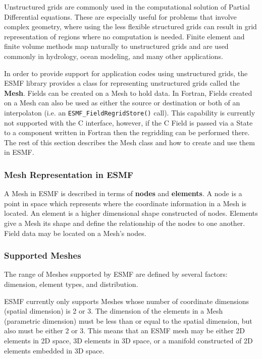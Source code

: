 
Unstructured grids are commonly used in the computational solution of Partial Differential equations.  These are especially useful for problems that involve complex geometry, where using the less flexible structured grids can
result in grid representation of regions where no computation is needed.  Finite
element and finite volume methods map naturally to unstructured grids and are used commonly
in hydrology, ocean modeling, and many other applications.

In order to provide support for application codes using unstructured grids, the ESMF library provides a class for representing 
unstructured grids called the {\bf Mesh}. Fields can be created on a Mesh to hold data. In Fortran, Fields created on a Mesh can also be used 
as either the source or destination or both of an interpolaton (i.e. an {\tt ESMF\_FieldRegridStore()} call). This capability is currently
not supported with the C interface, however, if the C Field is passed via a State to a component written in Fortran then the regridding
can be performed there. The rest of this section describes the Mesh class and how to create and use them in ESMF. 

\subsubsection{Mesh Representation in ESMF}

A Mesh in ESMF is described in terms of {\bf nodes} and {\bf elements}. A node is a point in space which represents where the coordinate 
information in a Mesh is located. An element is a higher dimensional shape constructed of nodes. Elements give a Mesh its shape and define the relationship of the nodes to one another. Field data may be located on a Mesh's nodes. 

\subsubsection{Supported Meshes}

The range of Meshes supported by ESMF are defined by several factors: dimension, element types, and distribution.

ESMF currently only supports Meshes whose number of coordinate dimensions (spatial dimension) is 2 or 3. The dimension of the elements in a Mesh
(parametric dimension) must be less than or equal to the spatial dimension, but also must be either 2 or 3. This means that an ESMF mesh may be
either 2D elements in 2D space, 3D elements in 3D space, or a manifold constructed of 2D elements embedded in 3D space. 

